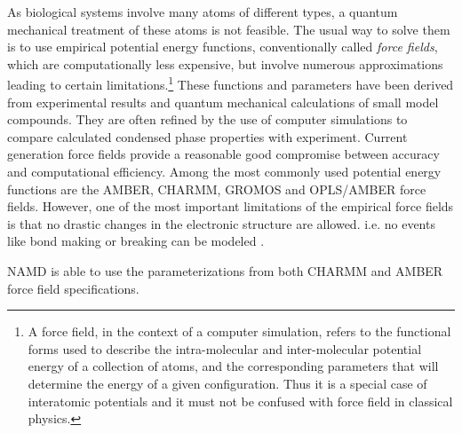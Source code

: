 As biological systems involve many atoms of different types, a quantum mechanical treatment of these atoms is not feasible. The usual way to solve them is to use empirical potential energy functions, conventionally called \textit{force fields}, which are computationally less expensive, but involve numerous approximations leading to certain limitations.\footnote{A force field, in the context of a computer simulation, refers to the functional forms used to describe the intra-molecular and inter-molecular potential energy of a collection of atoms, and the corresponding parameters that will determine the energy of a given configuration. Thus it is a special case of interatomic potentials and it must not be confused with force field in classical physics.} 
These functions and parameters have been derived from experimental results and quantum mechanical calculations of small model compounds. They are often refined by the use of computer simulations to compare calculated condensed phase properties with experiment.
Current generation force fields provide a reasonable good compromise between accuracy and computational efficiency. 
Among the most commonly used potential energy functions are the AMBER, CHARMM, GROMOS and OPLS/AMBER force fields. However, one of the most important limitations of the empirical force fields is that no drastic changes in the electronic structure are allowed. i.e. no events like bond making or breaking can be modeled \cite{ref:MDsim_Gkeka}.

NAMD is able to use the parameterizations from both CHARMM and AMBER force field specifications.

%

